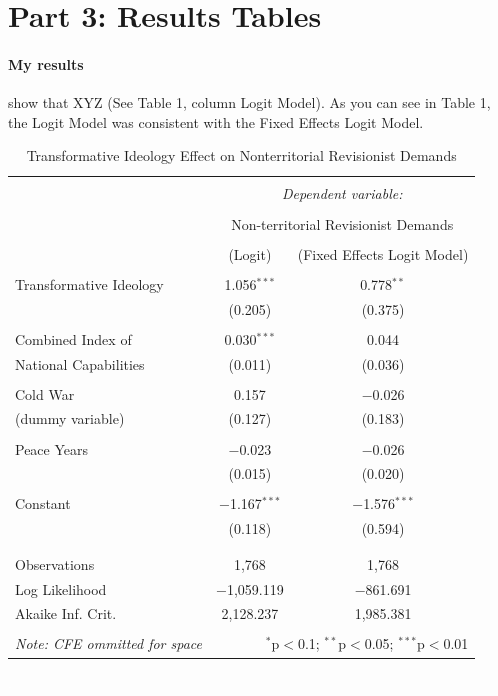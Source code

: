 \documentclass[12pt]{article}
\begin{document}
\section*{Part 3: Results Tables}

\paragraph*{My results} show that XYZ (See Table 1, column Logit Model). As you can see in Table 1, the Logit Model was consistent with the Fixed Effects Logit Model.

\begin{table}[H] \centering 
  \caption{Transformative Ideology Effect on Nonterritorial Revisionist Demands} 
  \label{} 
\begin{tabular}{@{\extracolsep{5pt}}lcc} 
\\[-1.8ex]\hline 
\hline \\[-1.8ex] 
 & \multicolumn{2}{c}{\textit{Dependent variable:}} \\ 
\cline{2-3} 
\\[-1.8ex] & \multicolumn{2}{c}{Non-territorial Revisionist Demands} \\ 
\\[-1.8ex] & (Logit) & (Fixed Effects Logit Model)\\ 
\hline \\[-1.8ex] 
 Transformative Ideology & 1.056$^{***}$ & 0.778$^{**}$ \\ 
  & (0.205) & (0.375) \\ 
  & & \\ 
 Combined Index of & 0.030$^{***}$ & 0.044 \\ 
  National Capabilities & (0.011) & (0.036) \\ 
  & & \\ 
 Cold War & 0.157 & $-$0.026 \\ 
 (dummy variable) & (0.127) & (0.183) \\ 
  & & \\ 
 Peace Years & $-$0.023 & $-$0.026 \\ 
  & (0.015) & (0.020) \\ 
  & & \\ 
 Constant & $-$1.167$^{***}$ & $-$1.576$^{***}$ \\ 
  & (0.118) & (0.594) \\ 
  & & \\ 
\hline \\[-1.8ex] 
Observations & 1,768 & 1,768 \\ 
Log Likelihood & $-$1,059.119 & $-$861.691 \\ 
Akaike Inf. Crit. & 2,128.237 & 1,985.381 \\ 
\hline 
\hline \\[-1.8ex] 
\textit{Note: CFE ommitted for space}  & \multicolumn{2}{r}{$^{*}$p$<$0.1; $^{**}$p$<$0.05; $^{***}$p$<$0.01} \\ 
\end{tabular} 
\end{table} 


\newpage

\singlespacing

{\textcolor{white}.}




\end{document}
